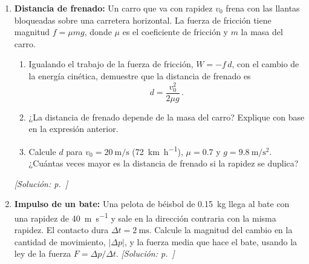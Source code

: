 \documentclass[11pt,a4paper]{book}
\begin{document}
\begin{enumerate}[label=\textbf{P\arabic*.}, ref=P\arabic*, leftmargin=*]
    \item\label{prob:parcial2-frenado} \textbf{Distancia de frenado:} Un
    carro que va con rapidez $v_0$ frena con las llantas bloqueadas sobre una
    carretera horizontal. La fuerza de fricción tiene magnitud
    $f = \mu m g$, donde $\mu$ es el coeficiente de fricción y $m$ la masa
    del carro.
    \begin{enumerate}
        \item Igualando el trabajo de la fuerza de fricción, $W = -f\,d$, con
        el cambio de la energía cinética, demuestre que la distancia de
        frenado es
        \begin{equation*}
            d = \frac{v_0^2}{2\mu g}\,.
        \end{equation*}
        \item ¿La distancia de frenado depende de la masa del carro? Explique
        con base en la expresión anterior.
        \item Calcule $d$ para $v_0 = \SI{20}{\meter\per\second}$
        (\SI{72}{\kilo\meter\per\hour}), $\mu = 0.7$ y
        $g = \SI{9.8}{\meter\per\second\squared}$. ¿Cuántas veces mayor es la
        distancia de frenado si la rapidez se duplica?
    \end{enumerate}
    \hfill\textit{[Solución: p.~\pageref{sol:parcial2-frenado}]}

    \item\label{prob:parcial2-impulso} \textbf{Impulso de un bate:} Una
    pelota de béisbol de \SI{0.15}{\kilogram} llega al bate con una rapidez
    de \SI{40}{\meter\per\second} y sale en la dirección contraria con la
    misma rapidez. El contacto dura $\Delta t = \SI{2}{\milli\second}$.
    Calcule la magnitud del cambio en la cantidad de movimiento,
    $\lvert\Delta p\rvert$, y la fuerza media que hace el bate, usando la ley
    de la fuerza $F = \Delta p/\Delta t$.
    \hfill\textit{[Solución: p.~\pageref{sol:parcial2-impulso}]}


\end{enumerate}
\end{document}
